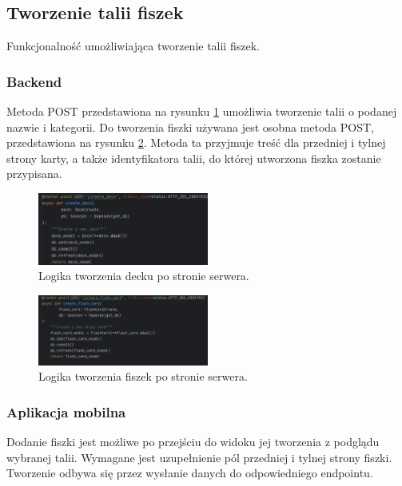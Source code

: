 \subsection{Tworzenie talii fiszek}

Funkcjonalność umożliwiająca tworzenie talii fiszek.

\subsubsection{Backend}

Metoda POST przedstawiona na rysunku \ref{img:create_deck_backend} umożliwia tworzenie talii o podanej nazwie i kategorii. Do tworzenia fiszki używana jest osobna metoda POST, przedstawiona na rysunku \ref{img:create_flash_card_backend}. Metoda ta przyjmuje treść dla przedniej i tylnej strony karty, a także identyfikatora talii, do której utworzona fiszka zostanie przypisana.

\begin{figure}[H]
    \centering
    \includegraphics[width=0.5\textwidth]{chapters/chapter_8/screens/create_deck_backend}
    \caption{Logika tworzenia decku po stronie serwera.}
    \label{img:create_deck_backend}
\end{figure}

\begin{figure}[H]
    \centering
    \includegraphics[width=0.5\textwidth]{chapters/chapter_8/screens/create_flash_card_backend}
    \caption{Logika tworzenia fiszek po stronie serwera.}
    \label{img:create_flash_card_backend}
\end{figure}

\subsubsection{Aplikacja mobilna}
Dodanie fiszki jest możliwe po przejściu do widoku jej tworzenia z podglądu wybranej talii. Wymagane jest uzupełnienie pól przedniej i tylnej strony fiszki. Tworzenie odbywa się przez wysłanie danych do odpowiedniego endpointu.

